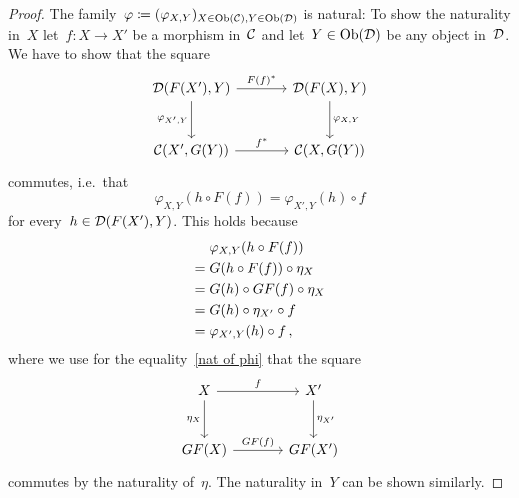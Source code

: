 \begin{proof}
  The family~$\varphi \coloneqq (\varphi_{X,Y})_{X \in \operatorname{Ob}(\mathcal{C}), Y \in \operatorname{Ob}(\mathcal{D})}$ is natural:
  To show the naturality in~$X$ let~$f \colon X \to X'$ be a morphism in~$\mathcal{C}$ and let~$Y \in \operatorname{Ob}(\mathcal{D})$ be any object in~$\mathcal{D}$.
  We have to show that the square
  \[
    \begin{tikzcd}[sep = large]
        \Dcat(F(X'), Y)
        \arrow{r}[above]{F(f)^*}
        \arrow{d}[left]{\varphi_{X',Y}}
      & \Dcat(F(X), Y)
        \arrow{d}[right]{\varphi_{X,Y}}
      \\
        \Ccat(X', G(Y))
        \arrow{r}[above]{f^*}
      & \Ccat(X, G(Y))
    \end{tikzcd}
  \]
  commutes, i.e.\ that
  \[
      \varphi_{X,Y}(h \circ F(f))
    = \varphi_{X',Y}(h) \circ f
  \]
  for every~$h \in \mathcal{D}(F(X'), Y)$.
  This holds because
  \begin{align}
     {}&  \varphi_{X,Y}(h \circ F(f)) \notag  \\
    ={}&  G(h \circ F(f)) \circ \eta_X  \notag  \\
    ={}&  G(h) \circ GF(f) \circ \eta_X \notag  \\
    ={}&  G(h) \circ \eta_{X'} \circ f  \label{nat of phi}  \\
    ={}&  \varphi_{X',Y}(h) \circ f \notag  \,,
  \end{align}
  where we use for the equality~\eqref{nat of phi} that the square
  \[
    \begin{tikzcd}[sep = large]
        X
        \arrow{r}[above]{f}
        \arrow{d}[left]{\eta_X}
      & X'
        \arrow{d}[right]{\eta_{X'}}
      \\
        GF(X)
        \arrow{r}[above]{GF(f)}
      & GF(X')
    \end{tikzcd}
  \]
  commutes by the naturality of~$\eta$.
  The naturality in~$Y$ can be shown similarly.
  

\end{proof}
